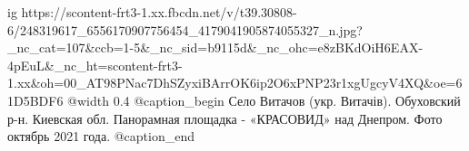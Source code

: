 
 
 
 
 

\ifcmt
  ig https://scontent-frt3-1.xx.fbcdn.net/v/t39.30808-6/248319617_6556170907756454_4179041905874055327_n.jpg?_nc_cat=107&ccb=1-5&_nc_sid=b9115d&_nc_ohc=e8zBKdOiH6EAX-4pEuL&_nc_ht=scontent-frt3-1.xx&oh=00_AT98PNac7DhSZyxiBArrOK6ip2O6xPNP23r1xgUgcyV4XQ&oe=61D5BDF6
  @width 0.4
  @caption_begin
    Село Витачов (укр. Витачів). Обуховский р-н. Киевская обл. 
    Панорамная площадка - «КРАСОВИД» над Днепром. Фото октябрь 2021 года.
  @caption_end
\fi
